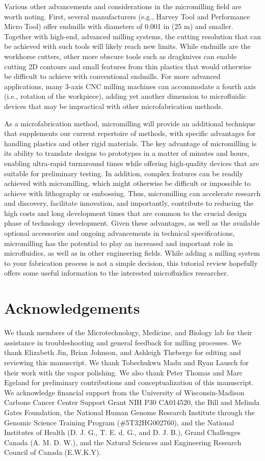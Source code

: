 Various other advancements and considerations in the micromilling field are worth noting. First, several manufacturers (e.g., Harvey Tool and Performance Micro Tool) offer endmills with diameters of 0.001 in (25 \textmu m) and smaller. Together with high-end, advanced milling systems, the cutting resolution that can be achieved with such tools will likely reach new limits. While endmills are the workhorse cutters, other more obscure tools such as dragknives can enable cutting 2D contours and small features from thin plastics that would otherwise be difficult to achieve with conventional endmills. For more advanced applications, many 3-axis CNC milling machines can accommodate a fourth axis (i.e., rotation of the workpiece), adding yet another dimension to microfluidic devices that may be impractical with other microfabrication methods. 

As a microfabrication method, micromilling will provide an additional technique that supplements our current repertoire of methods, with specific advantages for handling plastics and other rigid materials. The key advantage of micromilling is its ability to translate designs to prototypes in a matter of minutes and hours, enabling ultra-rapid turnaround times while offering high-quality devices that are suitable for preliminary testing. In addition, complex features can be readily achieved with micromilling, which might otherwise be difficult or impossible to achieve with lithography or embossing. Thus, micromilling can accelerate research and discovery, facilitate innovation, and importantly, contribute to reducing the high costs and long development times that are common to the crucial design phase of technology development. Given these advantages, as well as the available optional accessories and ongoing advancements in technical specifications, micromilling has the potential to play an increased and important role in microfluidics, as well as in other engineering fields. While adding a milling system to your fabrication process is not a simple decision, this tutorial review hopefully offers some useful information to the interested microfluidics researcher.

\section{Acknowledgements}
We thank members of the Microtechnology, Medicine, and Biology lab for their assistance in troubleshooting and general feedback for milling processes. We thank Elizabeth Jin, Brian Johnson, and Ashleigh Theberge for editing and reviewing this manuscript. We thank Tobechukwu Madu and Ryan Lausch for their work with the vapor polishing. We also thank Peter Thomas and Marc Egeland for preliminary contributions and conceptualization of this manuscript. We acknowledge financial support from the University of Wisconsin-Madison Carbone Cancer Center Support Grant NIH P30 CA014520, the Bill and Melinda Gates Foundation, the National Human Genome Research Institute through the Genomic Science Training Program (\#5T32HG002760), and the National Institutes of Health (D. J. G., T. E. d. G., and D. J. B.), Grand Challenges Canada (A. M. D. W.), and the Natural Sciences and Engineering Research Council of Canada (E.W.K.Y).